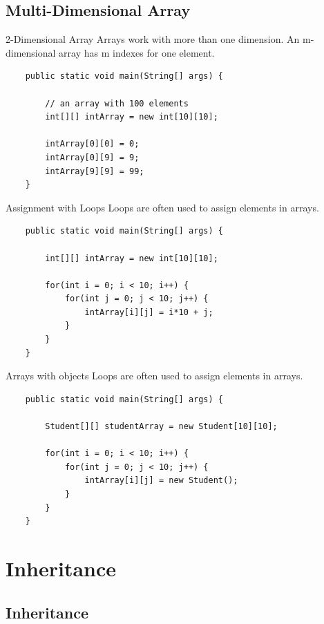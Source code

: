 \subsection{Multi-Dimensional Array}
\begin{frame}[fragile]{2-Dimensional Array}
	Arrays work with more than one dimension. 
	An m-dimensional array has m indexes for one element.
	\begin{lstlisting}
	public static void main(String[] args) {

	    // an array with 100 elements
	    int[][] intArray = new int[10][10];
	    
	    intArray[0][0] = 0;
	    intArray[0][9] = 9;
	    intArray[9][9] = 99;
	}
	\end{lstlisting}
\end{frame}

\begin{frame}[fragile]{Assignment with Loops}
	Loops are often used to assign elements in arrays.
	\begin{lstlisting}
	public static void main(String[] args) {

	    int[][] intArray = new int[10][10];
	    
	    for(int i = 0; i < 10; i++) {
	        for(int j = 0; j < 10; j++) {
	            intArray[i][j] = i*10 + j;
	        }
	    }
	}
	\end{lstlisting}
\end{frame}

\begin{frame}[fragile]{Arrays with objects}
	Loops are often used to assign elements in arrays.
	\begin{lstlisting}
	public static void main(String[] args) {

	    Student[][] studentArray = new Student[10][10];
	    
	    for(int i = 0; i < 10; i++) {
	        for(int j = 0; j < 10; j++) {
	            intArray[i][j] = new Student();
	        }
	    }
	}
	\end{lstlisting}
\end{frame}

\section{Inheritance}
\subsection{Inheritance}

